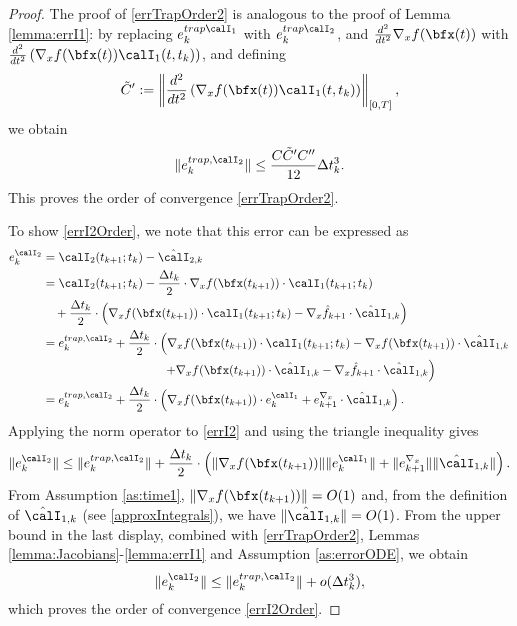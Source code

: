 \documentclass[DIV=12]{scrartcl} %
\newcommand{\err}{\ensuremath{e}}
\theoremstyle{definition}
\begin{document}
\begin{proof}
The proof of \eqref{errTrapOrder2} is analogous to the proof of Lemma \ref{lemma:errI1}: by replacing $\err_k^{trap\calI_1}$ with $\err_k^{trap\calI_2}$, and $\frac{d^2}{dt^2}\nabla_xf(\bfx(t))$ with $\frac{d^2}{dt^2}\left(\nabla_xf(\bfx(t))\calI_1(t,t_k)\right)$, and defining
\[
\tilde{C}':=\left\|\frac{d^2}{dt^2}\left(\nabla_xf(\bfx(t))\calI_1(t,t_k)\right)\right\|_{[0,T]},
\] we obtain
\[
\|\err_k^{trap,\calI_2}\|\le \frac{C\tilde{C}'C''}{12}\Delta t_k^3.
\]
This proves the order of convergence \eqref{errTrapOrder2}.

To show \eqref{errI2Order}, we note that this error can be expressed as
\begin{align}
    \err_k^{\calI_2} &= \calI_2(t_{k+1};t_k)-\hat{\calI}_{2,k} \nonumber\\
    &=\calI_2(t_{k+1};t_k) - \frac{\Delta t_k}{2}\cdot\nabla_xf(\bfx(t_{k+1}))\cdot\calI_1(t_{k+1};t_k) \nonumber \\ 
    &\quad + \frac{\Delta t_k}{2}\cdot\left(\nabla_xf(\bfx(t_{k+1}))\cdot\calI_1(t_{k+1};t_k) 
    -\nabla_x\hat{f}_{k+1}\cdot\hat{\calI}_{1,k}\right) \nonumber\\
    &=\err_k^{trap,\calI_2}+ \frac{\Delta t_k}{2}\cdot\left(\nabla_xf(\bfx(t_{k+1}))\cdot\calI_1(t_{k+1};t_k) - \nabla_xf(\bfx(t_{k+1})) \cdot\hat{\calI}_{1,k} \right. \nonumber \\
    & \qquad \qquad \qquad \qquad \qquad  \left. +\nabla_xf(\bfx(t_{k+1})) \cdot\hat{\calI}_{1,k} -\nabla_x\hat{f}_{k+1}\cdot\hat{\calI}_{1,k}\right)\nonumber\\
    &=\err_k^{trap,\calI_2}+\frac{\Delta t_k}{2}\cdot\left(\nabla_xf(\bfx(t_{k+1})) \cdot \err_k^{\calI_1}+\err_{k+1}^{\nabla_x}\cdot\hat{\calI}_{1,k}\right)\label{errI2}.
\end{align}
Applying the norm operator to \eqref{errI2} and using the triangle inequality gives
\begin{equation*}
    \|\err_k^{\calI_2}\|\le \|\err_k^{trap,\calI_2}\|+\frac{\Delta t_k}{2}\cdot\left(\|\nabla_xf(\bfx(t_{k+1}))\|\|\err_k^{\calI_1}\|+\|\err_{k+1}^{\nabla_x}\|\|\hat{\calI}_{1,k}\|\right).
\end{equation*}
 From Assumption \ref{as:time1}, $\|\nabla_xf(\bfx(t_{k+1}))\|=O(1)$ and, from the definition of $\hat{\calI}_{1,k}$ (see \eqref{approxIntegrals}), we have $\|\hat{\calI}_{1,k}\|=O(1)$. From the upper bound in the last display, combined with \eqref{errTrapOrder2}, Lemmas \ref{lemma:Jacobians}-\ref{lemma:errI1} and Assumption \ref{as:errorODE}, we obtain 
\[
\|\err_k^{\calI_2}\|\le \|\err_k^{trap,\calI_2}\|+o(\Delta t_k^3),
\]
which proves the order of convergence \eqref{errI2Order}.
\end{proof}
\end{document}

